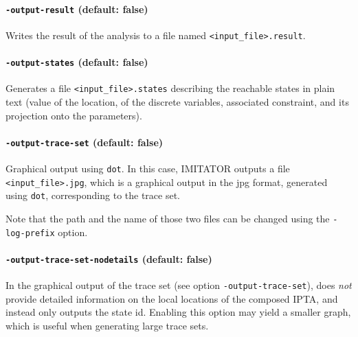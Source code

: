 \documentclass[a4paper,11pt]{report}
\newcommand{\gdot}{\texttt{dot}}
\newcommand{\imitator}{\textsf{IMITATOR}}
\newcommand{\IPTA}{IPTA}
\newcommand{\styleOption}[1]{\textcolor{optioncolor}{\texttt{#1}}}
\newcommand{\stylePath}[1]{\textcolor{pathcolor}{\texttt{#1}}}
\begin{document}
\paragraph{\styleOption{-output-result} (default: false)}
Writes the result of the analysis to a file named \stylePath{<input\_file>.result}.




\paragraph{\styleOption{-output-states} (default: false)}
Generates a file \stylePath{<input\_file>.states} describing the reachable states in plain text (value of the location, of the discrete variables, associated constraint, and its projection onto the parameters).


\paragraph{\styleOption{-output-trace-set} (default: false)}
Graphical output using \gdot{}.
In this case, \imitator{} outputs a file \stylePath{<input\_file>.jpg}, which is a graphical output in the jpg format, generated using \gdot{}, corresponding to the trace set.

Note that the path and the name of those two files can be changed using the \stylePath{-log-prefix} option.


\paragraph{\styleOption{-output-trace-set-nodetails} (default: false)}

In the graphical output of the trace set (see option \styleOption{-output-trace-set}),
does \emph{not} provide detailed information on the local locations of the composed \IPTA{}, and instead only outputs the state id.
Enabling this option may yield a smaller graph, which is useful when generating large trace sets.


\end{document}
